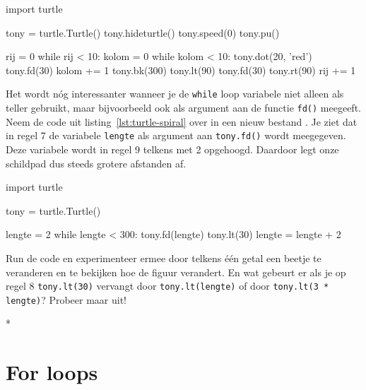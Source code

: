 \documentclass[../main]{subfiles}
\begin{document}
\begin{antwoord}
\begin{python-breakable}[style=mu-noframe]
import turtle

tony = turtle.Turtle()
tony.hideturtle()
tony.speed(0)
tony.pu()

rij = 0
while rij < 10:
    kolom = 0
    while kolom < 10:
        tony.dot(20, 'red')
        tony.fd(30)
        kolom += 1
    tony.bk(300)
    tony.lt(90)
    tony.fd(30)
    tony.rt(90)
    rij += 1
\end{python-breakable}
\end{antwoord}
\begin{opgave}[icons={laptop}]
Het wordt nóg interessanter wanneer je de \texttt{while} loop variabele niet alleen als teller gebruikt, maar bijvoorbeeld ook als argument aan de functie \texttt{fd()} meegeeft. Neem de code uit listing~\ref{lst:turtle-spiral} over in een nieuw bestand . Je ziet dat in regel 7 de variabele \texttt{lengte} als argument aan \texttt{tony.fd()} wordt meegegeven. Deze variabele wordt in regel 9 telkens met 2 opgehoogd. Daardoor legt onze schildpad dus steeds grotere afstanden af.

\begin{python}[style=mu, caption={Spiraal}, label={lst:turtle-spiral}]
import turtle

tony = turtle.Turtle()

lengte = 2
while lengte < 300:
    tony.fd(lengte)
    tony.lt(30)
    lengte = lengte + 2
\end{python}

Run de code en experimenteer ermee door telkens één getal een beetje te veranderen en te bekijken hoe de figuur verandert. En wat gebeurt er als je op regel 8 \texttt{tony.lt(30)} vervangt door \texttt{tony.lt(lengte)} of door \texttt{tony.lt(3 * lengte)}? Probeer maar uit!
\end{opgave}
\begin{antwoord}
*
\end{antwoord}

\begin{figure}[h]
\end{figure}
\section{For loops}%
\label{sec:for-loops}
\end{document}
